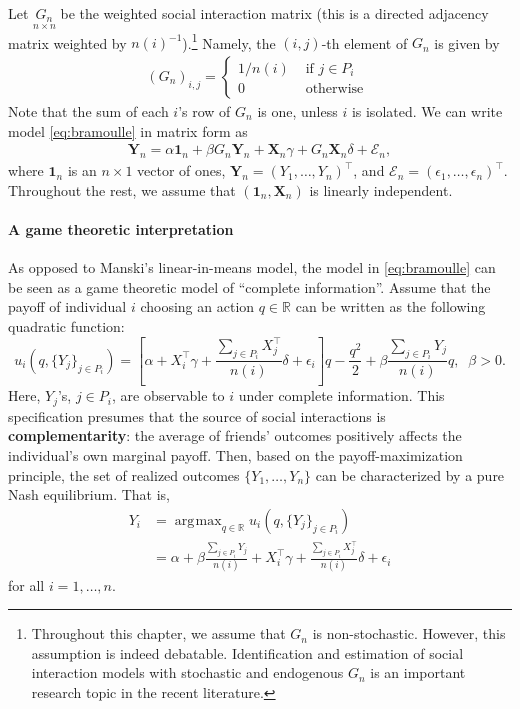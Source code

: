 \documentclass[10.5pt, A4paper, openany, uplatex]{book}
\newcommand{\mbf}{\mathbf}
\newcommand{\mcl}{\mathcal}
\newcommand{\mbb}{\mathbb}
\numberwithin{equation}{section}
\DeclareMathOperator*{\argmax}{\arg\!\max}
\begin{document}
Let $\underset{n \times n}{G_n}$ be the weighted social interaction matrix (this is a directed adjacency matrix weighted by $n(i)^{-1}$).\footnote{
	Throughout this chapter, we assume that $G_n$ is non-stochastic.
	However, this assumption is indeed debatable.
	Identification and estimation of social interaction models with stochastic and endogenous $G_n$ is an important research topic in the recent literature.
}
Namely, the $(i,j)$-th element of $G_n$ is given by
\begin{align*}
	 (G_n)_{i,j} = \left\{\begin{array}{ll}
	1/n(i) & \text{ if } j \in P_i \\
	0 & \text{ otherwise }
	\end{array}\right.
\end{align*}
Note that the sum of each $i$'s row of $G_n$ is one, unless $i$ is isolated.
We can write model \eqref{eq:bramoulle} in matrix form as
\begin{align}\label{eq:bramat}
	\mbf{Y}_n = \alpha \mathbf{1}_n + \beta G_n \mbf{Y}_n + \mbf{X}_n \gamma +  G_n \mbf{X}_n \delta + \mcl{E}_n, 
\end{align}
where $\mbf{1}_n$ is an $n\times 1$ vector of ones, $\mbf{Y}_n = (Y_1, \ldots, Y_n)^\top$, and $\mcl{E}_n = (\epsilon_1, \ldots, \epsilon_n)^\top$.
Throughout the rest, we assume that $(\mathbf{1}_n, \mbf{X}_n)$ is linearly independent.

\paragraph{A game theoretic interpretation}

As opposed to Manski's linear-in-means model,  the model in \eqref{eq:bramoulle} can be seen as a game theoretic model of ``complete information''.
Assume that the payoff of individual $i$ choosing an action $q \in \mbb{R}$ can be written as the following quadratic function:
\begin{equation*}
u_i(q, \{Y_j\}_{j \in P_i})=\left[ \alpha + X_i^\top \gamma +  \frac{\sum_{j \in P_i} X_j^\top}{n(i)} \delta + \epsilon_i  \right] q -\frac{q^{2}}{2} + \beta \frac{\sum_{j \in P_i} Y_j}{n(i)} q, \;\; \beta > 0.
\end{equation*}
Here, $Y_j$'s, $j \in P_i$, are observable to $i$ under complete information. 
This specification presumes that the source of social interactions is \textbf{complementarity}: the average of friends' outcomes positively affects the individual's own marginal payoff.
Then, based on the payoff-maximization principle, the set of realized outcomes $\{Y_1, \ldots, Y_n\}$ can be characterized by a pure Nash equilibrium.
That is, 
\begin{align*}
	Y_i 
	&= \argmax_{q \in \mbb{R}}u_i(q, \{Y_j\}_{j \in P_i}) \\
	&= \alpha + \beta \frac{\sum_{j \in P_i} Y_j}{n(i)} + X_i^\top \gamma +  \frac{\sum_{j \in P_i} X_j^\top}{n(i)} \delta + \epsilon_i
\end{align*}
for all $i = 1, \ldots, n$.
\end{document}
